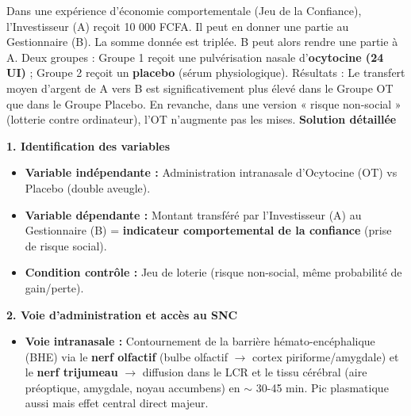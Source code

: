\documentclass[11pt]{article}
\begin{document}
\begin{exoresolu}
Dans une expérience d'économie comportementale (Jeu de la Confiance), l'Investisseur (A) reçoit 10 000 FCFA. Il peut en donner une partie au Gestionnaire (B). La somme donnée est triplée. B peut alors rendre une partie à A.
Deux groupes : Groupe 1 reçoit une pulvérisation nasale d'\textbf{ocytocine (24 UI)} ; Groupe 2 reçoit un \textbf{placebo} (sérum physiologique). Résultats : Le transfert moyen d'argent de A vers B est significativement plus élevé dans le Groupe OT que dans le Groupe Placebo. En revanche, dans une version « risque non-social » (lotterie contre ordinateur), l'OT n'augmente pas les mises.
\tcblower
\textbf{Solution détaillée}

\textbf{1. Identification des variables}
\begin{itemize}
    \item \textbf{Variable indépendante :} Administration intranasale d'Ocytocine (OT) vs Placebo (double aveugle).
    \item \textbf{Variable dépendante :} Montant transféré par l'Investisseur (A) au Gestionnaire (B) = \textbf{indicateur comportemental de la confiance} (prise de risque social).
    \item \textbf{Condition contrôle :} Jeu de loterie (risque non-social, même probabilité de gain/perte).
\end{itemize}

\textbf{2. Voie d'administration et accès au SNC}
\begin{itemize}
    \item \textbf{Voie intranasale :} Contournement de la barrière hémato-encéphalique (BHE) via le \textbf{nerf olfactif} (bulbe olfactif $\to$ cortex piriforme/amygdale) et le \textbf{nerf trijumeau} $\to$ diffusion dans le LCR et le tissu cérébral (aire préoptique, amygdale, noyau accumbens) en $\sim$ 30-45 min. Pic plasmatique aussi mais effet central direct majeur.
\end{itemize}


\end{exoresolu}
\end{document}

